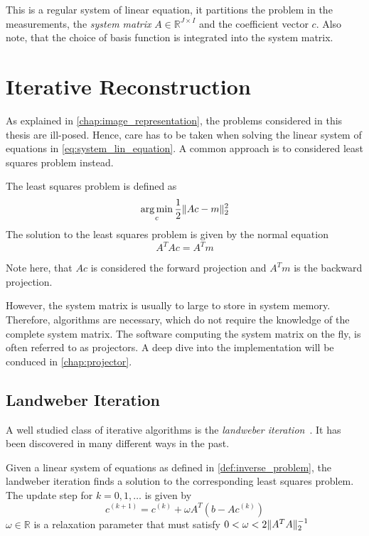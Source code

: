 This is a regular system of linear equation, it partitions the problem in the measurements, the
\textit{system matrix} \(A \in \mathbb{R}^{J \times I}\) and the coefficient vector \(c\). Also
note, that the choice of basis function is integrated into the system matrix.

\section{Iterative Reconstruction}\label{sec:iterative_reconstruction}

As explained in \autoref{chap:image_representation}, the problems considered in this thesis are
ill-posed. Hence, care has to be taken when solving the linear system of equations in
\autoref{eq:system_lin_equation}. A common approach is to considered least squares problem instead.

\begin{definition}\label{def:least_squares_problem}
	The least squares problem is defined as
	\[ \operatorname*{arg\,min}_c \frac{1}{2} \lVert Ac - m\rVert^2_2 \]
	The solution to the least squares problem is given by the normal equation
	\[ A^T A c = A^T m \]
\end{definition}

Note here, that \(Ac\) is considered the forward projection and \(A^T m\) is the backward
projection.

However, the system matrix is usually to large to store in system memory. Therefore, algorithms are
necessary, which do not require the knowledge of the complete system matrix. The software computing
the system matrix on the fly, is often referred to as projectors. A deep dive into the
implementation will be conduced in \autoref{chap:projector}.

\subsection{Landweber Iteration}\label{subsec:landweber_iteration}

A well studied class of iterative algorithms is the \textit{landweber
	iteration}~\cite{landweber_iteration_1951}. It has been discovered in many different ways in the
past.

\begin{definition}\label{def:landweber_iteration}
	Given a linear system of equations as defined in \autoref{def:inverse_problem}, the
	landweber iteration finds a solution to the corresponding least squares problem. The update
	step for \(k = 0, 1, \dots\) is given by
	\[
		c^{(k+1)} = c^{(k)} + \omega A^T(b - Ac^{(k)})
	\]
	\(\omega \in \mathbb{R}\) is a relaxation parameter that must satisfy \(0 < \omega < 2
	\lVert A^T A\rVert_2^{-1}\)
\end{definition}

